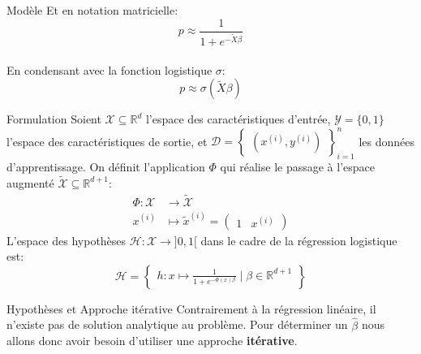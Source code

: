 \begin{frame}{Modèle}
	Et en notation matricielle:
	\begin{equation}
		p \approx \frac{1}{1 + e^{\displaystyle -\tilde{X} \beta}}
		\nonumber
	\end{equation} \\
	\vspace{0.5cm}
	En condensant avec la fonction logistique $\sigma$:
	\begin{equation}
		p \approx \sigma\left(\tilde{X} \beta\right)
		\nonumber
	\end{equation}
\end{frame}

\begin{frame}{Formulation}
	Soient $\mathcal{X} \subseteq \mathbb{R}^d$ l'espace des caractéristiques d'entrée,  $\mathcal{Y} = \{0, 1\}$ l'espace des caractéristiques de sortie, et $\mathcal{D} = \begin{Bmatrix}(x^{(i)}, y^{(i)})\end{Bmatrix}_{i=1}^n$ les données d'apprentissage. On définit l'application $\Phi$ qui réalise le passage à l'espace augmenté $\tilde{\mathcal{X}} \subseteq \mathbb{R}^{d+1}$:
	\begin{equation}
		\begin{aligned}
			\Phi: \mathcal{X} &\to \tilde{\mathcal{X}} \\
			x^{(i)} &\mapsto \tilde{x}^{(i)} = \begin{pmatrix}1 & x^{(i)}\end{pmatrix}
			\nonumber
		\end{aligned}
	\end{equation}
	L'espace des hypothèses $\mathcal{H}: \mathcal{X} \to ]0, 1[$ dans le cadre de la régression logistique est:
	\begin{equation}
		\mathcal{H} = \begin{Bmatrix}h: x \mapsto \displaystyle \frac{1}{1 + e^{-\Phi(x) \beta}} \mid \beta \in \mathbb{R}^{d+1}\end{Bmatrix}
		\nonumber
	\end{equation}
\end{frame}

\begin{frame}{Hypothèses et Approche itérative}
	Contrairement à la régression linéaire, il n'existe pas de solution analytique au problème. Pour déterminer un $\hat{\beta}$ nous allons donc avoir besoin d'utiliser une approche \textbf{itérative}. \\
\end{frame}

